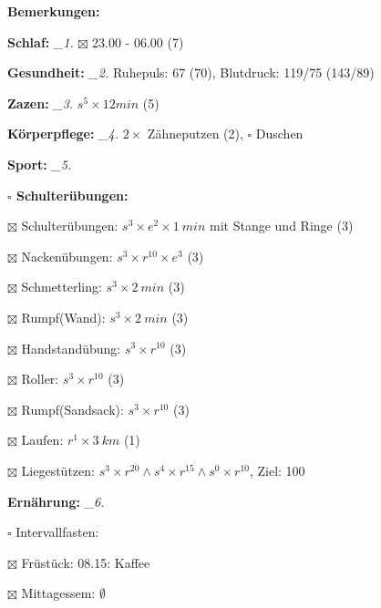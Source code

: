 \documentclass[10pt,a4paper]{article}
\newcommand\prop[1] {{\color {alizarin} {\bf #1}}}             %
\newcommand\mand[1] {{\color {burntorange} {\bf #1}}}          %
\newcommand\topspace{\vskip -15pt \hskip 20pt}
\newcommand\bottomspace{\vskip 4pt}
\newcommand\n[1] { {\sl #1.} \hskip 5pt }
\begin{document}
\begin{mdframed}[style=daystyle]
  \begin{labeling}{{\mand {Bemerkungen:}}}
    \setlength\itemsep{-3pt}
  \item[{\mand {Schlaf:}}]        \n{\_1} $\boxtimes$ 23.00 - 06.00 (7)
  \item[{\mand {Gesundheit:}}]    \n{\_2} Ruhepuls: 67 (70), Blutdruck: 119/75 (143/89)
  \item[{\mand {Zazen:}}]         \n{\_3} $s^5 \times 12 min$ (5)
  \item[{\mand {Körperpflege:}}]  \n{\_4} $2 \times$ Zähneputzen (2), $\square$ Duschen
  \item[{\mand {Sport:}}]         \n{\_5}
    \topspace
    \begin{minipage}{0.75\textwidth}  
      \begin{labeling}{\prop {$\square$ {Schulterübungen:}}} 
        \setlength\itemsep{-3pt}
      \item[$\boxtimes$ Schulterübungen:] $s^3 \times e^2 \times 1\ min$ mit Stange und Ringe (3)
      \item[$\boxtimes$ Nackenübungen:]   $s^3 \times r^{10} \times e^3$ (3)
      \item[$\boxtimes$ Schmetterling:]   $s^3 \times 2\ min$ (3)
      \item[$\boxtimes$ Rumpf(Wand):]     $s^3 \times 2\ min$ (3)
      \item[$\boxtimes$ Handstandübung:]  $s^3 \times r^{10}$ (3)
      \item[$\boxtimes$ Roller:]          $s^3 \times r^{10}$ (3)
      \item[$\boxtimes$ Rumpf(Sandsack):] $s^3 \times r^{10}$ (3)
      \item[$\boxtimes$ Laufen:]          $r^1 \times 3\ km$ (1)
      \item[$\boxtimes$ Liegestützen:]    $s^3 \times r^{20} \land s^4 \times r^{15} \land s^0 \times r^{10}$, Ziel: 100
      \end{labeling}
    \end{minipage}
    \bottomspace        
  \item[{\mand {Ernährung:}}]     \n{\_6}
    \topspace
    \begin{minipage}{0.75\textwidth}  
      \begin{labeling}{$\square$ Intervallfasten:} 
        \setlength\itemsep{-3pt}  
      \item[$\boxtimes$ Früstück:]         08.15: Kaffee
      \item[$\boxtimes$ Mittagessem:]      $\emptyset$

\end{labeling}
\end{minipage}
\end{labeling}
\end{mdframed}
\end{document}
